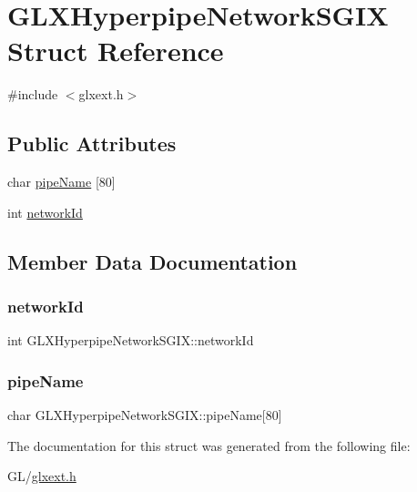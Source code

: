 \hypertarget{struct_g_l_x_hyperpipe_network_s_g_i_x}{}\section{G\+L\+X\+Hyperpipe\+Network\+S\+G\+IX Struct Reference}
\label{struct_g_l_x_hyperpipe_network_s_g_i_x}


{\ttfamily \#include $<$glxext.\+h$>$}

\subsection*{Public Attributes}
\begin{DoxyCompactItemize}
\item 
char \hyperlink{struct_g_l_x_hyperpipe_network_s_g_i_x_a91dc68bdd22c2a458ecb58037cd085bd}{pipe\+Name} \mbox{[}80\mbox{]}
\item 
int \hyperlink{struct_g_l_x_hyperpipe_network_s_g_i_x_a81393053988b32fadb0b21615024add1}{network\+Id}
\end{DoxyCompactItemize}


\subsection{Member Data Documentation}
\mbox{\label{struct_g_l_x_hyperpipe_network_s_g_i_x_a81393053988b32fadb0b21615024add1}} 
\subsubsection{\texorpdfstring{network\+Id}{networkId}}
{\footnotesize\ttfamily int G\+L\+X\+Hyperpipe\+Network\+S\+G\+I\+X\+::network\+Id}

\mbox{\label{struct_g_l_x_hyperpipe_network_s_g_i_x_a91dc68bdd22c2a458ecb58037cd085bd}} 
\subsubsection{\texorpdfstring{pipe\+Name}{pipeName}}
{\footnotesize\ttfamily char G\+L\+X\+Hyperpipe\+Network\+S\+G\+I\+X\+::pipe\+Name\mbox{[}80\mbox{]}}



The documentation for this struct was generated from the following file\+:\begin{DoxyCompactItemize}
\item 
G\+L/\hyperlink{glxext_8h}{glxext.\+h}\end{DoxyCompactItemize}
